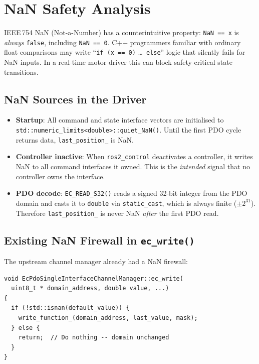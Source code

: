 \documentclass[11pt,a4paper]{article}
\begin{document}
\section{NaN Safety Analysis}
\label{sec:nan}

IEEE\,754 NaN (Not-a-Number) has a counterintuitive property: \texttt{NaN ==
x} is \emph{always} \texttt{false}, including \texttt{NaN == 0}.  C++
programmers familiar with ordinary float comparisons may write ``\texttt{if
(x == 0)} \ldots\ \texttt{else}'' logic that silently fails for NaN inputs.
In a real-time motor driver this can block safety-critical state transitions.

\subsection{NaN Sources in the Driver}

\begin{itemize}[nosep]
  \item \textbf{Startup}: All command and state interface vectors are
        initialised to \texttt{std::numeric\_limits<double>::quiet\_NaN()}.
        Until the first PDO cycle returns data, \texttt{last\_position\_} is
        NaN.
  \item \textbf{Controller inactive}: When \texttt{ros2\_control}
        deactivates a controller, it writes NaN to all command interfaces it
        owned.  This is the \emph{intended} signal that no controller owns
        the interface.
  \item \textbf{PDO decode}: \texttt{EC\_READ\_S32()} reads a signed 32-bit
        integer from the PDO domain and casts it to \texttt{double} via
        \texttt{static\_cast}, which is always finite ($\pm 2^{31}$).
        Therefore \texttt{last\_position\_} is never NaN \emph{after} the
        first PDO read.
\end{itemize}

\subsection{Existing NaN Firewall in \texttt{ec\_write()}}

The upstream channel manager already had a NaN firewall:

\begin{lstlisting}[caption={Existing NaN guard in \texttt{ec\_write()}}]
void EcPdoSingleInterfaceChannelManager::ec_write(
  uint8_t * domain_address, double value, ...)
{
  if (!std::isnan(default_value)) {
    write_function_(domain_address, last_value, mask);
  } else {
    return;  // Do nothing -- domain unchanged
  }
}
\end{lstlisting}
\end{document}
